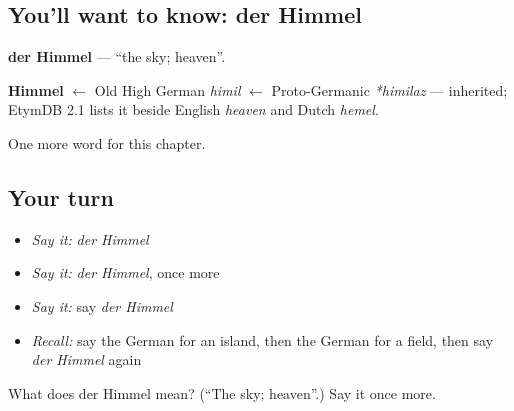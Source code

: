 \subsection*{You'll want to know: der Himmel}
\textbf{der Himmel} — \textquotedblleft{}the sky; heaven\textquotedblright{}.

\begin{cousinweb}
\textbf{Himmel} $\leftarrow$ Old High German \emph{himil} $\leftarrow$ Proto-Germanic \emph{*himilaz} — inherited; EtymDB 2.1 lists it beside English \emph{heaven} and Dutch \emph{hemel}.
\end{cousinweb}

\begin{grammarlens}[title={What you've built}]
One more word for this chapter.
\end{grammarlens}

\subsection*{Your turn}
\begin{itemize}
\raggedright
  \item \emph{Say it:} \emph{der Himmel}
  \item \emph{Say it:} \emph{der Himmel}, once more
  \item \emph{Say it:} say \emph{der Himmel}
  \item \emph{Recall:} say the German for an island, then the German for a field, then say \emph{der Himmel} again
\end{itemize}

\begin{tcolorbox}[breakable,colback=teal!4,colframe=teal!35!black,title={Before you move on}]
What does der Himmel mean? (\textquotedblleft{}The sky; heaven\textquotedblright{}.) Say it once more.
\end{tcolorbox}
